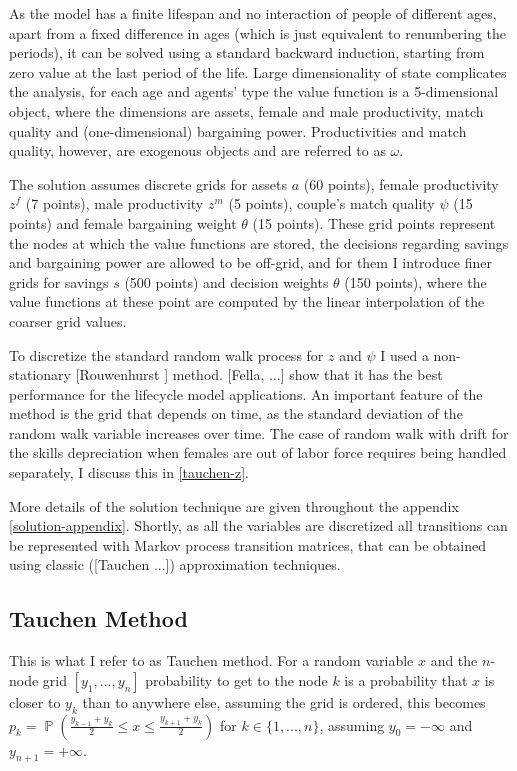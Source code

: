 \documentclass[12pt,letter]{article}
\DeclareMathOperator{\PP}{\mathbb{P}}
\renewcommand{\P}{\PP}
\begin{document}
As the model has a finite lifespan and no interaction of people of different ages, apart from a fixed difference in ages (which is just equivalent to renumbering the periods), it can be solved using a standard backward induction, starting from zero value at the last period of the life. Large dimensionality of state complicates the analysis, for each age and agents' type the value function is a 5-dimensional object, where the dimensions are assets, female and male productivity, match quality and (one-dimensional) bargaining power. Productivities and match quality, however, are exogenous objects and are referred to as $\omega$.

The solution assumes discrete grids for assets $a$ (60 points), female productivity $z^f$ (7 points), male productivity $z^m$ (5 points), couple's match quality $\psi$ (15 points) and female bargaining weight $\theta$ (15 points). These grid points represent the nodes at which the value functions are stored, the decisions regarding savings and bargaining power are allowed to be off-grid, and for them I introduce finer grids for savings $s$ (500 points) and decision weights $\theta$ (150 points), where the value functions at these point are computed by the linear interpolation of the coarser grid values.

To discretize the standard random walk process for $z$ and $\psi$ I used a non-stationary [Rouwenhurst ] method. [Fella, ...] show that it has the best performance for the lifecycle model applications. An important feature of the method is the grid that depends on time, as the standard deviation of the random walk variable increases over time. The case of random walk with drift for the skills depreciation when females are out of labor force requires being handled separately, I discuss this in \ref{tauchen-z}. 

More details of the solution technique are given throughout the appendix \ref{solution-appendix}. Shortly, as all the variables are discretized all transitions can be represented with Markov process transition matrices, that can be obtained using classic ([Tauchen ...]) approximation techniques. 


\subsection{Tauchen Method}
This is what I refer to as Tauchen method. For a random variable $x$ and the $n$-node grid $[y_1,...,y_n]$ probability to get to the node $k$ is a probability that $x$ is closer to $y_k$ than to anywhere else, assuming the grid is ordered, this becomes $p_k = \P\left(\frac{y_{k-1} + y_k}{2} \leq x \leq \frac{y_{k+1} + y_k}{2}\right)$ for $k \in \{1,...,n\}$, assuming $y_0 = -\infty$ and $y_{n+1} = +\infty$.
\end{document}
